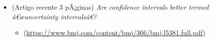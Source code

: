 \documentclass[]{article}
\newcommand{\euro}{€}
\providecommand{\tightlist}{%
  \setlength{\itemsep}{0pt}\setlength{\parskip}{0pt}}
\begin{document}
\vspace{0.5cm}

\begin{itemize}
\tightlist
\item
  (Artigo recente 3 pÃ¡ginas) \emph{Are confidence intervals better
  termed â\euro{}œuncertainty intervalsâ\euro{}?}

  \begin{itemize}
  \tightlist
  \item
    (\url{https://www.bmj.com/content/bmj/366/bmj.l5381.full.pdf})
  \end{itemize}
\end{itemize}
\end{document}

